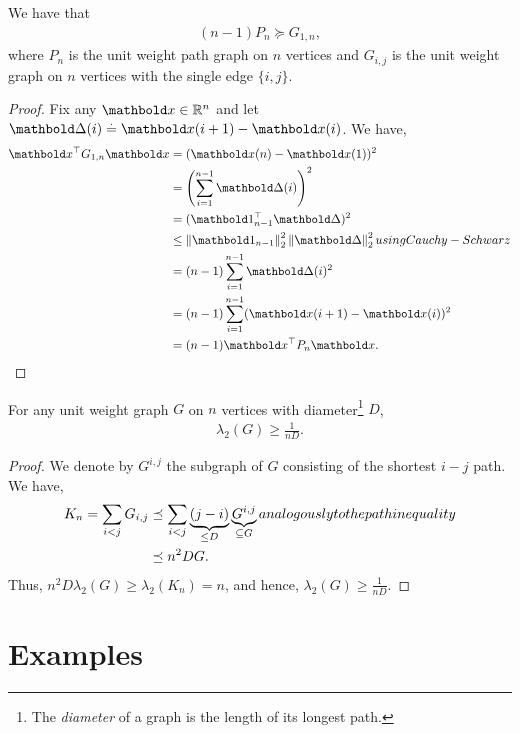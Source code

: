 \begin{lem} We have that \begin{align}
    (n-1) P_n \succeq G_{1,n},
\end{align} where $P_n$ is the unit weight path graph on $n$ vertices and $G_{i,j}$ is the unit weight graph on $n$ vertices with the single edge $\{i,j\}$.
\end{lem}
\begin{proof}
Fix any $\vx \in \R^n$ and let $\vDelta(i) \defeq \vx(i+1) - \vx(i)$. We have, \begin{align*}
    \trans{\vx}G_{1,n}\vx &= (\vx(n) - \vx(1))^2 \\
    &= \parentheses*{\sum_{i=1}^{n-1} \vDelta(i)}^2 \\
    &= (\trans{\vOne_{n-1}}\vDelta)^2 \\
    &\leq \norm{\vOne_{n-1}}_2^2 \norm{\vDelta}_2^2 \margintag{using Cauchy-Schwarz} \\
    &= (n-1) \sum_{i=1}^{n-1} \vDelta(i)^2 \\
    &= (n-1) \sum_{i=1}^{n-1} (\vx(i+1) - \vx(i))^2 \\
    &= (n-1)\trans{\vx}P_n\vx. \qedhere
\end{align*}
\end{proof}

\begin{lem}
For any unit weight graph $G$ on $n$ vertices with diameter\footnote{The \emph{diameter} of a graph is the length of its longest path.} $D$, \begin{align}
    \lambda_2(G) \geq \frac{1}{nD}.
\end{align}
\end{lem}
\begin{proof} We denote by $G^{i,j}$ the subgraph of $G$ consisting of the shortest $i-j$ path. We have, \begin{align*}
    K_n = \sum_{i < j} G_{i,j} &\preceq \sum_{i<j} \underbrace{(j-i)}_{\leq D} \underbrace{G^{i,j}}_{\subseteq G} \margintag{analogously to the path inequality} \\
    &\preceq n^2 D G.
\end{align*} Thus, $n^2 D \lambda_2(G) \geq \lambda_2(K_n) = n$, and hence, $\lambda_2(G) \geq \frac{1}{nD}$.
\end{proof}

\section{Examples}


